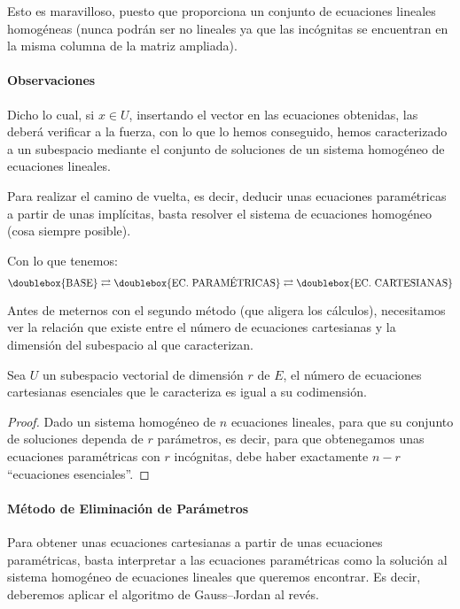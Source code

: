 Esto es maravilloso, puesto que proporciona un conjunto de ecuaciones lineales homogéneas (nunca podrán ser no lineales ya que las incógnitas se encuentran en la misma columna de la matriz ampliada).

\paragraph{Observaciones}
Dicho lo cual, si $x\in U$, insertando el vector en las ecuaciones obtenidas, las deberá verificar a la fuerza, con lo que lo hemos conseguido, hemos caracterizado a un subespacio mediante el conjunto de soluciones de un sistema homogéneo de ecuaciones lineales.

Para realizar el camino de vuelta, es decir, deducir unas ecuaciones paramétricas a partir de unas implícitas, basta resolver el sistema de ecuaciones homogéneo (cosa siempre posible).

Con lo que tenemos:
\begin{equation*}
	\doublebox{\textrm{BASE}}\rightleftarrows\doublebox{\textrm{EC. PARAMÉTRICAS}}\rightleftarrows\doublebox{\textrm{EC. CARTESIANAS}}
\end{equation*}

Antes de meternos con el segundo método (que aligera los cálculos), necesitamos ver la relación que existe entre el número de ecuaciones cartesianas y la dimensión del subespacio al que caracterizan.

\begin{prop}
	Sea $U$ un subespacio vectorial de dimensión $r$ de $E$, el número de ecuaciones cartesianas esenciales que le caracteriza es igual a su codimensión.
\end{prop}
\begin{proof}
	Dado un sistema homogéneo de $n$ ecuaciones lineales, para que su conjunto de soluciones dependa de $r$ parámetros, es decir, para que obtenegamos unas ecuaciones paramétricas con $r$ incógnitas, debe haber exactamente $n-r$ ``ecuaciones esenciales''.
\end{proof}
\paragraph{Método de Eliminación de Parámetros} Para obtener unas ecuaciones cartesianas a partir de unas ecuaciones paramétricas, basta interpretar a las ecuaciones paramétricas como la solución al sistema homogéneo de ecuaciones lineales que queremos encontrar. Es decir, deberemos aplicar el algoritmo de Gauss--Jordan al revés.
\newpage
